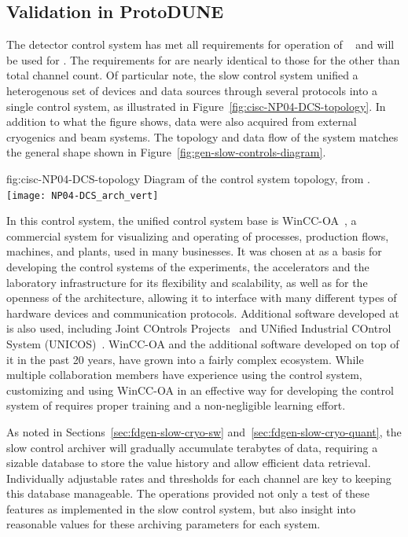 \subsection{Validation in ProtoDUNE}
\label{sec:cisc-slow-control-pdsp}

The  detector control system has met
all requirements for operation of ~\cite{pdspdcs_proc} and will be used for . The requirements for  are
nearly identical to those for the  other than
total channel count. Of particular note, the  slow control system unified a heterogenous set of devices and data sources
through several protocols into a
single control system, as illustrated in
Figure~\ref{fig:cisc-NP04-DCS-topology}. In addition to what
the figure shows, data were also acquired from external cryogenics and beam
systems.  The topology and data flow of the system matches the general
shape shown in Figure~\ref{fig:gen-slow-controls-diagram}.

\begin{dunefigure}{fig:cisc-NP04-DCS-topology}
{Diagram of the  control system topology, from \cite{pdspdcs_proc}.}
\texttt{[image: NP04-DCS\_arch\_vert]}
\end{dunefigure}

In this control system, the unified control system base is WinCC-OA~\cite{winccoa}, a commercial  system for visualizing and operating of processes, production flows, machines, and plants, used
in many businesses. It was chosen at  as a basis for
developing the control systems of the  experiments, the
accelerators and the laboratory infrastructure for its flexibility and
scalability, as well as for the openness of the architecture, allowing
it to interface with many different types of hardware devices and
communication protocols. Additional software developed at 
is also used, including Joint COntrols Projects~\cite{jcop} and UNified
Industrial COntrol System (UNICOS)~\cite{unicos}. WinCC-OA and the
additional software developed on top of it in the past 20 years, have
grown into a fairly complex ecosystem. While multiple collaboration
members have experience using the  control system,
customizing and using WinCC-OA in an effective way for developing the
control system of  requires proper training and a
non-negligible learning effort.

As noted in Sections~\ref{sec:fdgen-slow-cryo-sw} and~\ref{sec:fdgen-slow-cryo-quant},
the slow control archiver will gradually accumulate terabytes of
data, requiring a sizable database to store the value history and
allow efficient data retrieval. Individually adjustable rates and
thresholds for each channel are key to keeping this database
manageable. The  operations provided not only a test of
these features as implemented in the  slow control system, but also insight into
reasonable values for these archiving parameters for each system.


